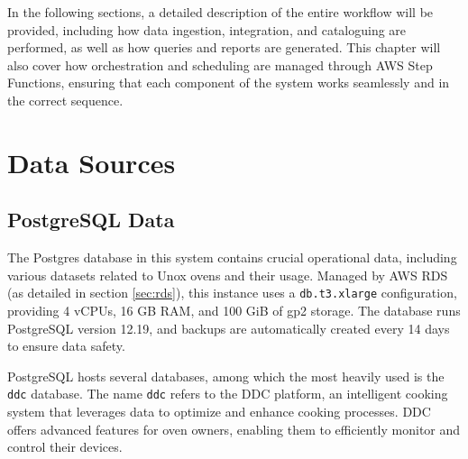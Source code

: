 In the following sections, a detailed description of the entire workflow will be provided, including how data ingestion, integration, and cataloguing are performed, as well as how queries and reports are generated. This chapter will also cover how orchestration and scheduling are managed through \ac{AWS} Step Functions, ensuring that each component of the system works seamlessly and in the correct sequence.


\section{Data Sources}

\subsection{PostgreSQL Data}
The Postgres database in this system contains crucial operational data, including various datasets related to Unox ovens and their usage. Managed by \ac{AWS} RDS (as detailed in section \ref{sec:rds}), this instance uses a \texttt{db.t3.xlarge} configuration, providing 4 vCPUs, 16 GB RAM, and 100 GiB of gp2 storage. The database runs PostgreSQL version 12.19, and backups are automatically created every 14 days to ensure data safety.

PostgreSQL hosts several databases, among which the most heavily used is the \texttt{ddc} database. The name \texttt{ddc} refers to the \acf{DDC} platform, an intelligent cooking system that leverages data to optimize and enhance cooking processes. \ac{DDC} offers advanced features for oven owners, enabling them to efficiently monitor and control their devices.

